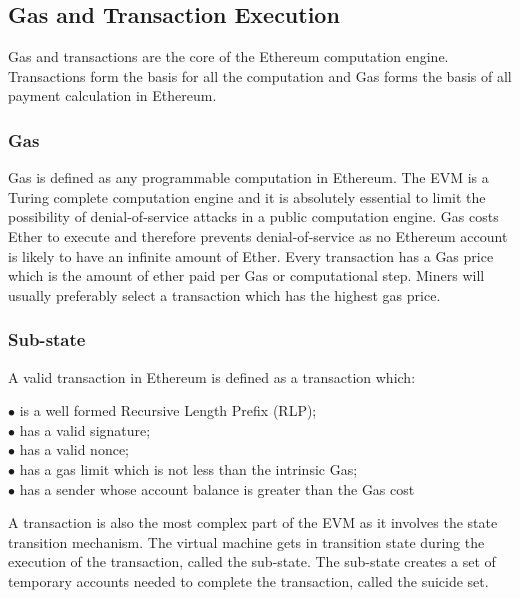 \documentclass[a4paper,twoside,phd]{BYUPhys}
\begin{document}
\subsection{Gas and Transaction Execution}
Gas and transactions are the core of the Ethereum computation engine. Transactions form the basis for all the computation and Gas forms the basis of all payment calculation in Ethereum\cite{ButerinAPLATFORM}.
\subsubsection{Gas}
Gas is defined as any programmable computation in Ethereum\cite{ButerinAPLATFORM}. The EVM is a Turing complete computation engine and it is absolutely essential to limit the possibility of denial-of-service attacks in a public computation engine\cite{ButerinAPLATFORM}. Gas costs Ether to execute and therefore prevents denial-of-service as no Ethereum account is likely to have an infinite amount of Ether\cite{ButerinAPLATFORM}. Every transaction has a Gas price which is the amount of ether paid per Gas or computational step\cite{ButerinAPLATFORM}. Miners will usually preferably select a transaction which has the highest gas price.
\subsubsection{Sub-state}
A valid transaction in Ethereum is defined as a transaction which\cite{Wood2018ETHEREUM:LEDGER}:
\begin{description}
\item [$\bullet$ is a well formed Recursive Length Prefix (RLP);]
\item [$\bullet$ has a valid signature;]
\item [$\bullet$ has a valid nonce;]
\item [$\bullet$ has a gas limit which is not less than the intrinsic Gas;]
\item [$\bullet$ has a sender whose account balance is greater than the Gas cost]
\end{description}

A transaction is also the most complex part of the EVM as it involves the state transition mechanism\cite{Wood2018ETHEREUM:LEDGER}. The virtual machine gets in transition state during the execution of the transaction, called the sub-state\cite{Wood2018ETHEREUM:LEDGER}. The sub-state creates a set of temporary accounts needed to complete the transaction, called the suicide set\cite{Wood2018ETHEREUM:LEDGER}.
\end{document}
